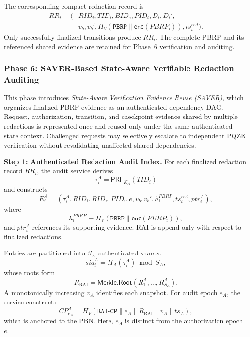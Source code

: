 \documentclass[lettersize,journal]{IEEEtran}
\begin{document}
The corresponding compact redaction record is
\begin{equation}
\begin{aligned}
RR_i=\big(
&RID_i,TID_i,BID_e,PID_i,D_i,D_i',\\
&v_b,v_b',H_V(\texttt{PBRP}\parallel
\mathsf{enc}(PBRP_i)),ts_i^{red}\big).
\end{aligned}
\end{equation}
Only successfully finalized transitions produce $RR_i$. The complete
PBRP and its referenced shared evidence are retained for Phase~6
verification and auditing.


\subsubsection*{\textbf{Phase 6: SAVER-Based State-Aware
Verifiable Redaction Auditing}}

This phase introduces \emph{State-Aware Verification Evidence Reuse
(SAVER)}, which organizes finalized PBRP evidence as an authenticated
dependency DAG. Request, authorization, transition, and checkpoint
evidence shared by multiple redactions is represented once and reused
only under the same authenticated state context. Challenged requests
may selectively escalate to independent PQZK verification without
revalidating unaffected shared dependencies.

\medskip
\noindent\textbf{Step 1: Authenticated Redaction Audit Index.}
For each finalized redaction record $RR_i$, the audit service derives
\begin{equation}
\tau_i^A=\mathsf{PRF}_{K_A}(TID_i)
\end{equation}
and constructs
\begin{equation}
E_i^A=
(\tau_i^A,RID_i,BID_e,PID_i,e,v_b,v_b',
h_i^{PBRP},ts_i^{red},ptr_i^A),
\end{equation}
where
\begin{equation}
h_i^{PBRP}
=
H_V(\texttt{PBRP}\parallel\mathsf{enc}(PBRP_i)),
\end{equation}
and $ptr_i^A$ references its supporting evidence. RAI is append-only
with respect to finalized redactions.

Entries are partitioned into $S_A$ authenticated shards:
\begin{equation}
sid_i^A=H_A(\tau_i^A)\bmod S_A,
\end{equation}
whose roots form
\begin{equation}
R_{\mathrm{RAI}}
=
\mathsf{Merkle.Root}(R_1^A,\ldots,R_{S_A}^A).
\end{equation}
A monotonically increasing $v_A$ identifies each snapshot. For audit
epoch $e_A$, the service constructs
\begin{equation}
CP_{e_A}^A
=
H_V(
\texttt{RAI-CP}\parallel e_A\parallel
R_{\mathrm{RAI}}\parallel v_A\parallel ts_A),
\end{equation}
which is anchored to the PBN. Here, $e_A$ is distinct from the
authorization epoch $e$.
\end{document}
